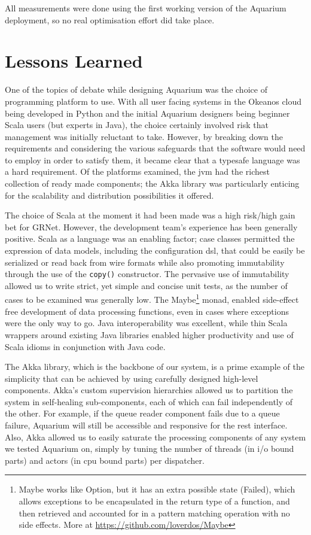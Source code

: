 \documentclass[preprint,10pt]{sigplanconf}
\begin{document}
All measurements were done using the first working version of the
Aquarium deployment, so no real optimisation effort did take place. 


\section{Lessons Learned}

One of the topics of debate while designing Aquarium was the choice of
programming platform to use. With all user facing systems in the Okeanos cloud
being developed in Python and the initial Aquarium designers being beginner
Scala users (but experts in Java), the choice certainly involved risk that
management was initially reluctant to take. However, by breaking down the
requirements and considering the various safeguards that the software would
need to employ in order to satisfy them, it became clear that a
typesafe language was a hard requirement. Of the platforms examined, the {\sc
jvm} had the richest collection of ready made components; the Akka library was
particularly enticing for the scalability and distribution possibilities it
offered.

The choice of Scala at the moment it had been made was a high risk/high gain
bet for GRNet. However, the development team's experience has been generally
positive. Scala as a language was an enabling factor; case classes permitted
the expression of data models, including the configuration {\sc dsl}, that
could be easily be serialized or read back from wire formats while also
promoting immutability through the use of the \texttt{copy()} constructor. The
pervasive use of immutability allowed us to write strict, yet simple and
concise unit tests, as the number of cases to be examined was generally low.
The \textsf{Maybe}\footnote{\textsf{Maybe} works like \textsf{Option}, but it
has an extra possible state (\textsf{Failed}), which allows exceptions to be
encapsulated in the return type of a function, and then retrieved and accounted
for in a pattern matching operation with no side effects. More at
\url{https://github.com/loverdos/Maybe}} monad, enabled side-effect free
development of data processing functions, even in cases where exceptions were
the only way to go. Java interoperability was excellent, while thin Scala
wrappers around existing Java libraries enabled higher productivity and use of
Scala idioms in conjunction with Java code.

The Akka library, which is the backbone of our system, is a prime example of 
the simplicity that can be achieved by using carefully designed high-level
components. Akka's custom supervision hierarchies allowed us to partition the
system in self-healing sub-components, each of which can fail independently
of the other. For example, if the queue reader component fails due to a queue
failure, Aquarium will still be accessible and responsive for the {\sc rest}
interface. Also, Akka allowed us to easily saturate the processing components
of any system we tested Aquarium on, simply by tuning the number of threads (in
{\sc i/o} bound parts) and actors (in {\sc cpu} bound parts) per dispatcher. 
\end{document}
